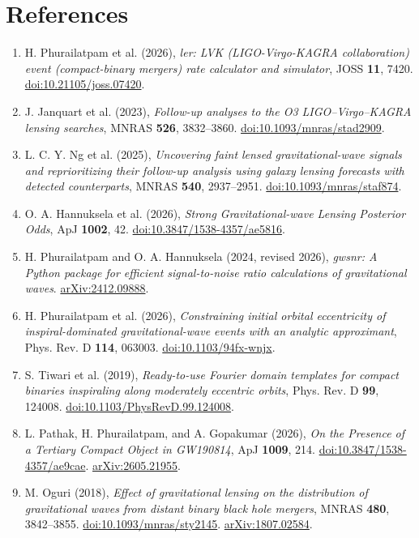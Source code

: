 \documentclass[11pt]{article}
\begin{document}
\section*{References}
\small
\begin{enumerate}[itemsep=7pt]
\item H. Phurailatpam et al. (2026), \textit{ler: LVK (LIGO-Virgo-KAGRA collaboration) event (compact-binary mergers) rate calculator and simulator}, JOSS \textbf{11}, 7420. \href{https://doi.org/10.21105/joss.07420}{doi:10.21105/joss.07420}.
\item J. Janquart et al. (2023), \textit{Follow-up analyses to the O3 LIGO--Virgo--KAGRA lensing searches}, MNRAS \textbf{526}, 3832--3860. \href{https://doi.org/10.1093/mnras/stad2909}{doi:10.1093/mnras/stad2909}.
\item L. C. Y. Ng et al. (2025), \textit{Uncovering faint lensed gravitational-wave signals and reprioritizing their follow-up analysis using galaxy lensing forecasts with detected counterparts}, MNRAS \textbf{540}, 2937--2951. \href{https://doi.org/10.1093/mnras/staf874}{doi:10.1093/mnras/staf874}.
\item O. A. Hannuksela et al. (2026), \textit{Strong Gravitational-wave Lensing Posterior Odds}, ApJ \textbf{1002}, 42. \href{https://doi.org/10.3847/1538-4357/ae5816}{doi:10.3847/1538-4357/ae5816}.
\item H. Phurailatpam and O. A. Hannuksela (2024, revised 2026), \textit{gwsnr: A Python package for efficient signal-to-noise ratio calculations of gravitational waves}. \href{https://arxiv.org/abs/2412.09888}{arXiv:2412.09888}.
\item H. Phurailatpam et al. (2026), \textit{Constraining initial orbital eccentricity of inspiral-dominated gravitational-wave events with an analytic approximant}, Phys. Rev. D \textbf{114}, 063003. \href{https://doi.org/10.1103/94fx-wnjx}{doi:10.1103/94fx-wnjx}.
\item S. Tiwari et al. (2019), \textit{Ready-to-use Fourier domain templates for compact binaries inspiraling along moderately eccentric orbits}, Phys. Rev. D \textbf{99}, 124008. \href{https://doi.org/10.1103/PhysRevD.99.124008}{doi:10.1103/PhysRevD.99.124008}.
\item L. Pathak, H. Phurailatpam, and A. Gopakumar (2026), \textit{On the Presence of a Tertiary Compact Object in GW190814}, ApJ \textbf{1009}, 214. \href{https://doi.org/10.3847/1538-4357/ae9cae}{doi:10.3847/1538-4357/ae9cae}. \href{https://arxiv.org/abs/2605.21955}{arXiv:2605.21955}.
\item M. Oguri (2018), \textit{Effect of gravitational lensing on the distribution of gravitational waves from distant binary black hole mergers}, MNRAS \textbf{480}, 3842--3855. \href{https://doi.org/10.1093/mnras/sty2145}{doi:10.1093/mnras/sty2145}. \href{https://arxiv.org/abs/1807.02584}{arXiv:1807.02584}.

\end{enumerate}
\end{document}
